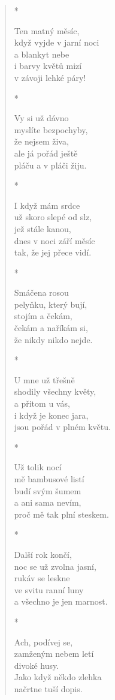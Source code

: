 \begin{verse}
*

Ten matný měsíc, \\
když vyjde v jarní noci\\
a blankyt nebe\\
i barvy květů mizí\\
v závoji lehké páry!

*

Vy si už dávno\\
myslíte bezpochyby,\\
že nejsem živa,\\
ale já pořád ještě\\
pláču a v pláči žiju.

*

I když mám srdce\\
už skoro slepé od slz, \\
jež stále kanou,\\
dnes v noci září měsíc\\
tak, že jej přece vidí.

*

Smáčena rosou\\
pelyňku, který bují,\\
stojím a čekám, \\
čekám a naříkám si, \\
že nikdy nikdo nejde.
 
*

U mne už třešně\\
shodily všechny květy, \\
a přitom u vás,\\
i když je konec jara,\\
jsou pořád v plném květu.

*

Už tolik nocí \\
mě bambusové listí \\
budí svým šumem\\
a ani sama nevím,\\
proč mě tak plní steskem.

*

Další rok končí,  \\
noc se už zvolna jasní,\\
rukáv se leskne \\
ve svitu ranní luny\\
a všechno je jen marnost.

*

Ach, podívej se,\\
zamženým nebem letí\\
divoké husy.\\
Jako když někdo zlehka\\
načrtne tuší dopis. 


\end{verse}
